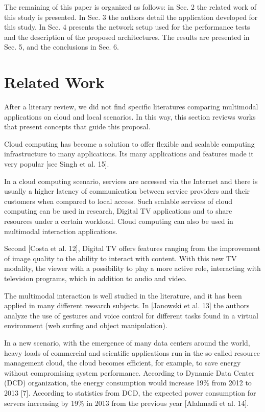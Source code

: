 \documentclass{cai}
\begin{document}
The remaining of this paper is organized as follows: in Sec. 2 the related work of this study is presented. In Sec. 3 the authors detail the application developed for this study. In Sec. 4 presents the network setup used for the performance tests and the description of the proposed architectures. The results are presented in Sec. 5, and the conclusions in Sec. 6.

\section{Related Work}
After a literary review, we did not find specific literatures comparing multimodal applications on cloud and local scenarios. In this way, this section reviews works that present concepts that guide this proposal.

Cloud computing has become a solution to offer flexible and scalable computing infrastructure to many applications. Its many applications and features made it very popular [see Singh et al. 15].

In a cloud computing scenario, services are accessed via the Internet and there is usually a higher latency of communication between service providers and their customers when compared to local access. Such scalable services of cloud computing can be used in research, Digital TV applications and to share resources under a certain workload. Cloud computing can also be used in multimodal interaction applications.

Second [Costa et al. 12], Digital TV offers features ranging from the improvement of image quality to the ability to interact with content. With this new TV modality, the viewer with a possibility to play a more active role, interacting with television programs, which in addition to audio and video. 

The multimodal interaction is well studied in the literature, and it has been applied in many different research subjects. In [Janowski et al. 13] the authors analyze the use of gestures and voice control for different tasks found in a virtual environment (web surfing and object manipulation).

In a new scenario, with the emergence of many data centers around the world, heavy loads of commercial and scientific applications run in the so-called resource management cloud, the cloud becomes efficient, for example, to save energy without compromising system performance. According to Dynamic Data Center (DCD) organization, the energy consumption would increase 19\% from 2012 to 2013 [7]. According to statistics from DCD, the expected power consumption for servers increasing by 19\% in 2013 from the previous year [Alahmadi et al. 14].
\end{document}
